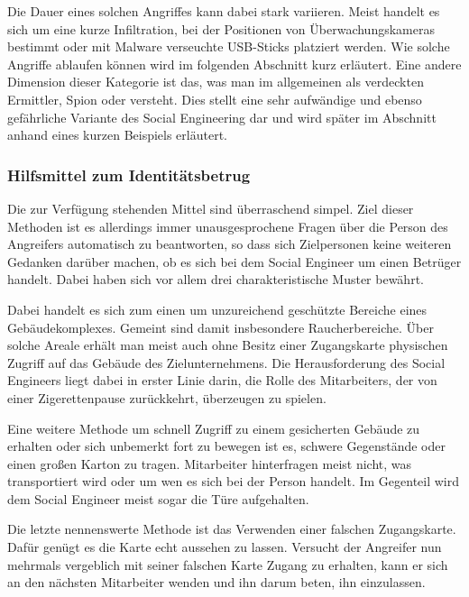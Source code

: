 Die Dauer eines solchen Angriffes kann dabei stark variieren. Meist handelt es sich um eine kurze Infiltration, bei der Positionen von Überwachungskameras bestimmt oder mit Malware verseuchte USB-Sticks  platziert werden. Wie solche Angriffe ablaufen können wird im folgenden Abschnitt kurz erläutert.
Eine andere Dimension dieser Kategorie ist das, was man im allgemeinen als verdeckten Ermittler, Spion oder  versteht. Dies stellt eine sehr aufwändige und ebenso gefährliche Variante des Social Engineering dar und wird später im Abschnitt  anhand eines kurzen Beispiels erläutert. \cite{hadnagy}\cite{hacking-the-human}

\subsubsection*{Hilfsmittel zum Identitätsbetrug}\label{sec:hilfsmittel-zum-identitätsbetrug}
Die zur Verfügung stehenden Mittel sind überraschend simpel. Ziel dieser Methoden ist es allerdings immer unausgesprochene Fragen über die Person des Angreifers automatisch zu beantworten, so dass sich Zielpersonen keine weiteren Gedanken darüber machen, ob es sich bei dem Social Engineer um einen Betrüger handelt. Dabei haben sich vor allem drei charakteristische Muster bewährt.

Dabei handelt es sich zum einen um unzureichend geschützte Bereiche eines Gebäudekomplexes. Gemeint sind damit insbesondere Raucherbereiche. Über solche Areale erhält man meist auch ohne Besitz einer Zugangskarte physischen Zugriff auf das Gebäude des Zielunternehmens.
Die Herausforderung des Social Engineers liegt dabei in erster Linie darin, die Rolle des Mitarbeiters, der von einer Zigerettenpause zurückkehrt, überzeugen zu spielen.

Eine weitere Methode um schnell Zugriff zu einem gesicherten Gebäude zu erhalten oder sich unbemerkt fort zu bewegen ist es, schwere Gegenstände oder einen großen Karton zu tragen. Mitarbeiter hinterfragen meist nicht, was transportiert wird oder um wen es sich bei der Person handelt. Im Gegenteil wird dem Social Engineer meist sogar die Türe aufgehalten.

Die letzte nennenswerte Methode ist das Verwenden einer falschen Zugangskarte. Dafür genügt es die Karte echt aussehen zu lassen. Versucht der Angreifer nun mehrmals vergeblich mit seiner falschen Karte Zugang zu erhalten, kann er sich an den nächsten Mitarbeiter wenden und ihn darum beten, ihn einzulassen.
\cite{hadnagy}

